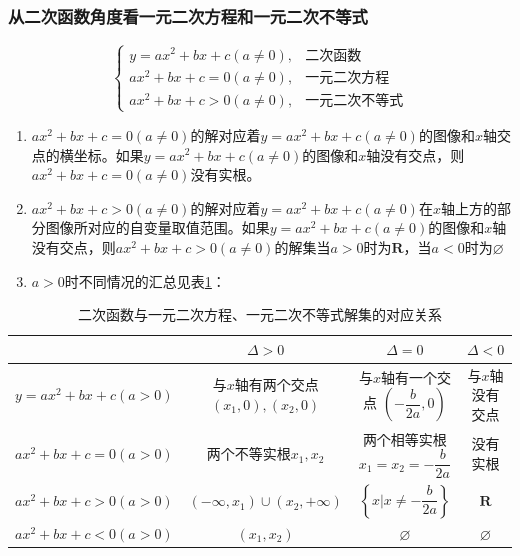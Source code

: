 \subsubsection*{从二次函数角度看一元二次方程和一元二次不等式}
\begin{equation*}
    \left \{
    \begin{array}{cl}
         y = ax^2 + bx + c (a \neq 0), & \mbox{二次函数} \\
         ax^2 + bx + c = 0 (a \neq 0), & \mbox{一元二次方程} \\
         ax^2 + bx + c > 0 (a \neq 0), &  \mbox{一元二次不等式}
    \end{array}
    \right.
\end{equation*}
\begin{enumerate}
    \item $ax^2 + bx + c = 0 (a \neq 0)$的解对应着$y = ax^2 + bx + c (a \neq 0)$的图像和$x$轴交点的横坐标。如果$y = ax^2 + bx + c (a \neq 0)$的图像和$x$轴没有交点，则$ax^2 + bx + c = 0 (a \neq 0)$没有实根。
    \item $ax^2 + bx + c > 0 (a \neq 0)$的解对应着$y = ax^2 + bx + c (a \neq 0)$在$x$轴上方的部分图像所对应的自变量取值范围。如果$y = ax^2 + bx + c (a \neq 0)$的图像和$x$轴没有交点，则$ax^2 + bx + c > 0 (a \neq 0)$的解集当$a > 0$时为$\mathbf{R}$，当$a < 0$时为$\varnothing$
    \item $a>0$时不同情况的汇总见表\ref{tab:tab1}：
\end{enumerate}

\begin{table}[h]
    \centering
    \begin{tabular}{|c|c|c|c|}
        \hline
        & $\Delta > 0$ & $\Delta = 0$ & $\Delta < 0$\\
        \hline
        $y = ax^2 + bx + c (a > 0)$ & \makecell[c]{与$x$轴有两个交点 \\ $(x_1, 0), (x_2, 0)$} & \makecell[c]{与$x$轴有一个交点 \\ $\left(-\dfrac{b}{2a}, 0\right) $} & 与$x$轴没有交点 \\
        \hline
        $ax^2 + bx + c = 0 (a > 0)$ & 两个不等实根$x_1, x_2$ & \makecell[c]{两个相等实根 \\ $x_1 = x_2 = -\dfrac{b}{2a}$} & 没有实根\\
        \hline
        $ax^2 + bx + c > 0 (a > 0)$ & $(-\infty, x_1) \cup (x_2, +\infty)$ & $\left\{x | x \neq -\dfrac{b}{2a}\right\}$ & $\mathbf{R}$ \\
        \hline
        $ax^2 + bx + c < 0 (a > 0)$ & $(x_1, x_2)$  & $\varnothing$ &  $\varnothing$ \\
        \hline
    \end{tabular}
    \caption{二次函数与一元二次方程、一元二次不等式解集的对应关系}
    \label{tab:tab1}
\end{table}
